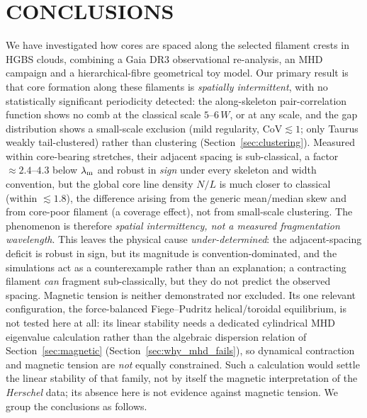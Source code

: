\documentclass[usenatbib,twoside,twocolumn]{mnras}
\begin{document}
\section{CONCLUSIONS}

We have investigated how cores are spaced along the selected filament crests in HGBS clouds, combining a Gaia DR3 observational re-analysis, an MHD campaign and a hierarchical-fibre geometrical toy model. Our primary result is that core formation along these filaments is \emph{spatially intermittent}, with no statistically significant periodicity detected: the along-skeleton pair-correlation function shows no comb at the classical scale $5$--$6\,W$, or at any scale, and the gap distribution shows a small-scale exclusion (mild regularity, CoV$\lesssim1$; only Taurus weakly tail-clustered) rather than clustering (Section~\ref{sec:clustering}). Measured within core-bearing stretches, their adjacent spacing is sub-classical, a factor $\approx2.4$--$4.3$ below $\lambda_{\rm m}$ and robust in \emph{sign} under every skeleton and width convention, but the global core line density $N/L$ is much closer to classical (within $\lesssim1.8$), the difference arising from the generic mean/median skew and from core-poor filament (a coverage effect), not from small-scale clustering. The phenomenon is therefore \emph{spatial intermittency, not a measured fragmentation wavelength}. This leaves the physical cause \emph{under-determined}: the adjacent-spacing deficit is robust in sign, but its magnitude is convention-dominated, and the simulations act as a counterexample rather than an explanation; a contracting filament \emph{can} fragment sub-classically, but they do not predict the observed spacing. Magnetic tension is neither demonstrated nor excluded. Its one relevant configuration, the force-balanced Fiege--Pudritz helical/toroidal equilibrium, is not tested here at all: its linear stability needs a dedicated cylindrical MHD eigenvalue calculation rather than the algebraic dispersion relation of Section~\ref{sec:magnetic} (Section~\ref{sec:why_mhd_fails}), so dynamical contraction and magnetic tension are \emph{not} equally constrained. Such a calculation would settle the linear stability of that family, not by itself the magnetic interpretation of the \textit{Herschel} data; its absence here is not evidence against magnetic tension. We group the conclusions as follows.
\end{document}
